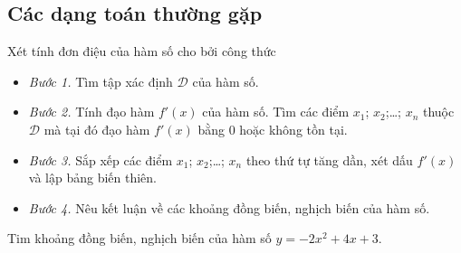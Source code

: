 \subsection{Các dạng toán thường gặp}
\begin{dang}{Xét tính đơn điệu của hàm số cho bởi công thức}
	\begin{itemize}
		\item \textit{Bước 1.} Tìm tập xác định $\mathscr{D}$ của hàm số.
		\item \textit{Bước 2.} Tính đạo hàm $f'(x)$ của hàm số. Tìm các điểm $x_1$; $x_2$;\ldots; $x_n$ thuộc $\mathscr{D}$ mà tại đó đạo hàm $f'(x)$ bằng $0$ hoặc không tồn tại.
		\item \textit{Bước 3.} Sắp xếp các điểm $x_1$; $x_2$;\ldots; $x_n$ theo thứ tự tăng dần, xét dấu $f'(x)$ và lập bảng biến thiên.
		\item \textit{Bước 4.} Nêu kết luận về các khoảng đồng biến, nghịch biến của hàm số.
	\end{itemize}
\end{dang}
\begin{vd}%
	Tim khoảng đồng biến, nghịch biến của hàm số $y=-2x^2+4x+3$.
\end{vd}
